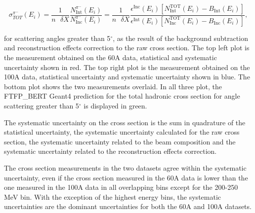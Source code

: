 \begin{equation}
 \sigma^{\pi^-}_{TOT}(E_{i})  =\frac{1}{n\text{ } \delta X}\frac{N^{\pi^-}_{ \text{Int}} (E_{i})}{N^{\pi^-}_{ \text{Inc}}(E_{i})} = \frac{1}{n \text{ }\delta X}\frac{ \epsilon^{\text{Inc}}(E_i) [ N^{ \text{TOT}}_{ \text{Int}} (E_{i}) - B_{ \text{Int}} (E_i)] }{   \epsilon^{\text{Int}}(E_i) [N^{ \text{TOT}}_{ \text{Inc}}(E_{i}) - B_{ \text{Inc}} (E_i)]},
\end{equation}

for  scattering angles greater than 5$^\circ$, as the result of the background subtraction and reconstruction effects correction to the raw cross section. The top left plot is the measurement obtained on the 60A data, statistical and systematic uncertainty shown in red. The top right plot is the measurement obtained on the 100A data, statistical uncertainty and systematic uncertainty shown in blue. The bottom plot shows the two measurements overlaid. In all three plot, the FTFP\_BERT Geant4 prediction for the total hadronic cross section for angle scattering greater than 5$^\circ$ is displayed in green. 

The systematic uncertainty on the cross section is the sum in quadrature of the statistical uncertainty, the systematic uncertainty calculated for the raw cross section, the systematic uncertainty related to the beam composition and the systematic uncertainty related to the reconstruction effects correction.

The cross section measurements in the two datasets agree within the systematic uncertainty, even if the cross section measured in the 60A data is lower than the one measured in the 100A data in all overlapping bins except for the 200-250 MeV bin. With the exception of the highest energy bins, the systematic uncertainties are the dominant uncertainties for both the 60A and 100A datasets.

